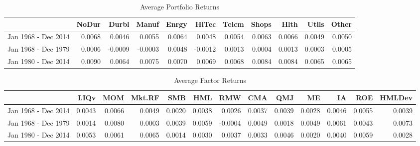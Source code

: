 \begin{sidewaystable}[ht]
	\centering
	\begin{tabular}{rrrrrrrrrrr}
		\hline
		& NoDur & Durbl & Manuf & Enrgy & HiTec & Telcm & Shops & Hlth & Utils & Other \\ 
		\hline
		Jan 1968 - Dec 2014 & 0.0068 & 0.0046 & 0.0055 & 0.0064 & 0.0048 & 0.0054 & 0.0063 & 0.0066 & 0.0049 & 0.0050 \\ 
		Jan 1968 - Dec 1979 & 0.0006 & -0.0009 & -0.0003 & 0.0048 & -0.0012 & 0.0013 & 0.0004 & 0.0013 & 0.0003 & 0.0005 \\ 
			Jan 1980 - Dec 2014 & 0.0090 & 0.0064 & 0.0075 & 0.0070 & 0.0069 & 0.0068 & 0.0084 & 0.0084 & 0.0065 & 0.0065 \\ 
		\hline
	\end{tabular}
		\caption{Average Portfolio Returns}
\end{sidewaystable}

\begin{sidewaystable}[ht]
	\centering
	\begin{tabular}{rrrrrrrrrrrrr}
		\hline
		& LIQv & MOM & Mkt.RF & SMB & HML & RMW & CMA & QMJ & ME & IA & ROE & HMLDev \\ 
		\hline
		 Jan 1968 - Dec 2014 & 0.0043 & 0.0066 & 0.0049 & 0.0020 & 0.0038 & 0.0026 & 0.0037 & 0.0039 & 0.0028 & 0.0046 & 0.0055 & 0.0039 \\ 
		Jan 1968 - Dec 1979 & 0.0014 & 0.0080 & 0.0003 & 0.0039 & 0.0059 & -0.0004 & 0.0049 & 0.0018 & 0.0049 & 0.0061 & 0.0043 & 0.0073 \\ 
		Jan 1980 - Dec 2014 & 0.0053 & 0.0061 & 0.0065 & 0.0014 & 0.0030 & 0.0037 & 0.0033 & 0.0046 & 0.0020 & 0.0040 & 0.0059 & 0.0028 \\ 
		\hline
	\end{tabular}
	\caption{Average Factor Returns}
\end{sidewaystable}

